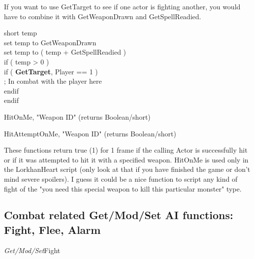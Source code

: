 \documentclass[
]{article}
\begin{document}
If you want to use GetTarget to see if one actor is fighting another,
you would have to combine it with GetWeaponDrawn and GetSpellReadied.

short temp\\
set temp to GetWeaponDrawn\\
set temp to ( temp + GetSpellReadied )\\
if ( temp \textgreater{} 0 )\\
\hspace*{0.333em}\hspace*{0.333em}\hspace*{0.333em}\hspace*{0.333em}if (
\textbf{GetTarget}, Player == 1 )\\
\hspace*{0.333em}\hspace*{0.333em}\hspace*{0.333em}\hspace*{0.333em}\hspace*{0.333em}\hspace*{0.333em}
; In combat with the player here\\
\hspace*{0.333em}\hspace*{0.333em}\hspace*{0.333em}\hspace*{0.333em}endif\\
endif

HitOnMe, "Weapon ID" (returns Boolean/short)

HitAttemptOnMe, "Weapon ID" (returns Boolean/short)

These functions return true (1) for 1 frame if the calling Actor is
successfully hit or if it was attempted to hit it with a specified
weapon. HitOnMe is used only in the LorkhanHeart script (only look at
that if you have finished the game or don't mind severe spoilers). I
guess it could be a nice function to script any kind of fight of the
"you need this special weapon to kill this particular monster" type.

\hypertarget{combat-related-getmodset-ai-functions-fight-flee-alarm}{%
\subsection{Combat related Get/Mod/Set AI functions: Fight, Flee,
Alarm}\label{combat-related-getmodset-ai-functions-fight-flee-alarm}}

\emph{Get/Mod/Set}Fight
\end{document}
